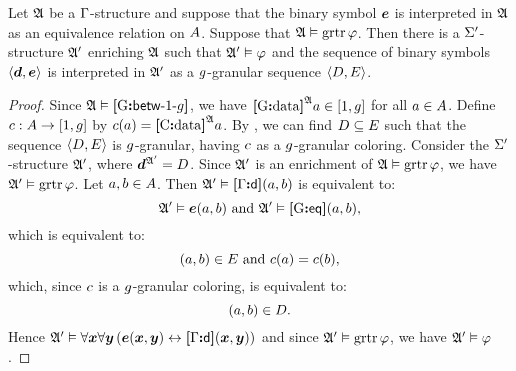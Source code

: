 \begin{lemma}\label{lem:granular-tr-to-f}
Let $\mathfrak{A}$ be a $\mathrm{\Gamma}$-structure and suppose that the binary symbol $\bm{e}$ is
interpreted in $\mathfrak{A}$ as an equivalence relation on $A$.
Suppose that $\mathfrak{A} \vDash \operatorname{grtr}\varphi$.
Then there is a $\mathrm{\Sigma'}$-structure $\mathfrak{A'}$ enriching $\mathfrak{A}$ such that 
$\mathfrak{A'} \vDash \varphi$ and the sequence of binary symbols $\left\langle \bm{d},\bm{e} \right\rangle$ is
interpreted in $\mathfrak{A'}$ as a $g$-granular sequence $\left\langle D,E \right\rangle$.
\end{lemma}
\begin{proof}
Since $\mathfrak{A} \vDash {\bm{[}{\mathrm{G}}\mathord{\bm{:}}\mathsf{betw}{\hbox{-}}1{\hbox{-}}g\bm{]}}$, we have 
${\bm{[}{\mathrm{G}}\mathord{\bm{:}}\mathrm{data}\bm{]}}^{\mathfrak{A}}a \in [1,g]$ for all $a \in A$.
Define ${c : A \to [1,g]}$ by $c(a) = {\bm{[}{\mathrm{C}}\mathord{\bm{:}}\mathrm{data}\bm{]}}^{\mathfrak{A}}a$.
By , we can find $D \subseteq E$ such that 
the sequence $\left\langle D,E \right\rangle$ is $g$-granular, having $c$ as a
$g$-granular coloring.
Consider the $\mathrm{\Sigma'}$-structure $\mathfrak{A'}$, where $\bm{d}^{\mathfrak{A'}} = D$.
Since $\mathfrak{A'}$ is an enrichment of $\mathfrak{A} \vDash \operatorname{grtr}\varphi$, we have
$\mathfrak{A'} \vDash \operatorname{grtr}\varphi$.
Let $a,b \in A$. 
Then $\mathfrak{A'} \vDash {\bm{[}\mathrm{\Gamma}\mathord{\bm{:}}\mathsf{d}\bm{]}}(a,b)$ is equivalent to:
\[
  \mathfrak{A'} \vDash \bm{e}(a,b) \text{ and } \mathfrak{A'} \vDash {\bm{[}{\mathrm{G}}\mathord{\bm{:}}\mathsf{eq}\bm{]}}(a,b),
\]
which is equivalent to:
\[
  (a,b) \in E \text{ and } c(a) = c(b),
\]
which, since $c$ is a $g$-granular coloring, is equivalent to:
\[
  (a,b) \in D.
\]
Hence
$\mathfrak{A'} \vDash \forall\bm{x}\forall\bm{y}
\left(\bm{e}(\bm{x},\bm{y}) \leftrightarrow {\bm{[}\mathrm{\Gamma}\mathord{\bm{:}}\mathsf{d}\bm{]}}(\bm{x},\bm{y})\right)$
and since $\mathfrak{A'} \vDash \operatorname{grtr}\varphi$, we have $\mathfrak{A'} \vDash \varphi$.
\end{proof}